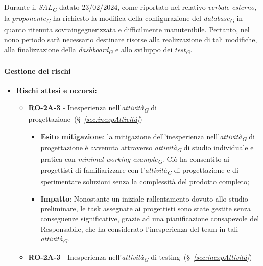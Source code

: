 Durante il \textit{SAL}\textsubscript{\textit{G}} datato 23/02/2024, come riportato nel relativo \textit{verbale esterno}, la \textit{proponente}\textsubscript{\textit{G}} ha richiesto la modifica della configurazione del \textit{database}\textsubscript{\textit{G}} in quanto ritenuta sovraingegnerizzata e difficilmente manutenibile. Pertanto, nel nono periodo sarà necessario destinare risorse alla realizzazione di tali modifiche, alla finalizzazione della \textit{dashboard}\textsubscript{\textit{G}} e allo sviluppo dei \textit{test}\textsubscript{\textit{G}}.

\paragraph{Gestione dei rischi} 

\begin{itemize}
    \item \textbf{Rischi attesi e occorsi:}
\begin{itemize}
    \item \textbf{RO-2A-3} - Inesperienza nell'\textit{attività}\textsubscript{\textit{G}} di progettazione~(\S~\textit{\ref{sec:inexpAttività}})
        \begin{itemize}
            \item \textbf{Esito mitigazione}: 
            la mitigazione dell'inesperienza nell'\textit{attività}\textsubscript{\textit{G}} di progettazione è avvenuta attraverso \textit{attività}\textsubscript{\textit{G}} di studio individuale e pratica con \textit{minimal working example}\textsubscript{\textit{G}}. Ciò ha consentito ai progettisti di familiarizzare con l'\textit{attività}\textsubscript{\textit{G}} di progettazione e di sperimentare soluzioni senza la complessità del prodotto completo;
            \item \textbf{Impatto}: Nonostante un iniziale rallentamento dovuto allo studio preliminare, le task assegnate ai progettisti sono state gestite senza conseguenze significative, grazie ad una pianificazione consapevole del Responsabile, che ha considerato l'inesperienza del team in tali \textit{attività}\textsubscript{\textit{G}}.
        \end{itemize}
    \item \textbf{RO-2A-3} - Inesperienza nell'\textit{attività}\textsubscript{\textit{G}} di testing~(\S~\textit{\ref{sec:inexpAttività}})
        \begin{itemize}

\end{itemize}
\end{itemize}
\end{itemize}
